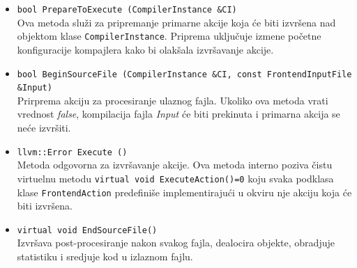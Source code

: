 \documentclass[12pt,oneside]{memoir}
\begin{document}
\begin{itemize}
  \item \lstinline{bool PrepareToExecute (CompilerInstance &CI)} \\
  Ova metoda slu\v{z}i za pripremanje primarne akcije koja \'{c}e biti izvr\v{s}ena nad objektom klase \lstinline{CompilerInstance}.
  Priprema uklju\v{c}uje izmene po\v{c}etne konfiguracije kompajlera kako bi olak\v{s}ala izvr\v{s}avanje akcije.
  \item \lstinline{bool BeginSourceFile (CompilerInstance &CI, const FrontendInputFile &Input)} \\
  Prirprema akciju za procesiranje ulaznog fajla. Ukoliko ova metoda vrati vrednost \textit{false}, kompilacija fajla \textit{Input} \'{c}e biti prekinuta
  i primarna akcija se ne\'{c}e izvr\v{s}iti.
  \item \lstinline{llvm::Error Execute ()} \\
  Metoda odgovorna za izvr\v{s}avanje akcije. Ova metoda interno poziva \v{c}istu virtuelnu metodu \lstinline{virtual void ExecuteAction()=0}
  koju svaka podklasa klase \lstinline{FrontendAction} predefini\v{s}e implementiraju\'{c}i u okviru nje akciju koja \'ce biti izvr\v{s}ena.
  \item \lstinline{virtual void EndSourceFile()} \\ 
  Izvr\v{s}ava post-procesiranje nakon svakog fajla, dealocira objekte, obradjuje statistiku i sredjuje kod u izlaznom fajlu.
\end{itemize}
\end{document}
